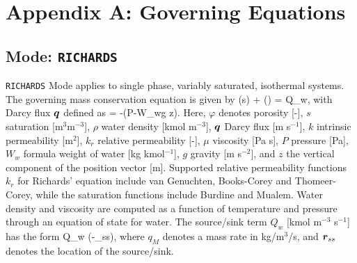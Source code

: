 
\appendix

\section*{Appendix A: Governing Equations}

\renewcommand{\thesection}{\Alph{section}}
\setcounter{section}{1}
\renewcommand{\thesubsection}{\Alph{section}-\arabic{subsection}}

\renewcommand{\theequation}{\Alph{section}-\arabic{equation}}
\setcounter{equation}{0}

\renewcommand{\thetable}{\Alph{section}-\arabic{table}}
\setcounter{table}{0}

\renewcommand{\thefigure}{\Alph{section}-\arabic{figure}}
\setcounter{figure}{0}

\subsection{Mode: {\tt RICHARDS}}

{\tt RICHARDS} Mode applies to single phase, variably saturated, isothermal systems. The governing mass conservation equation is given by
\EQ
{}\left(\varphi s\rho\right) + \bnabla\cdot\left(\rho\bq\right) = Q_w,
\EN
with Darcy flux $\boldsymbol{q}$ defined as
\EQ
\bq = -\bnabla\left(P-W_w\rho g z\right).
\EN
Here, $\varphi$ denotes porosity [-], 
$s$ saturation [m$^3$m$^{-3}$], 
$\rho$ water density [kmol m$^{-3}$], 
$\boldsymbol{q}$ Darcy flux [m s$^{-1}$], 
$k$ intrinsic permeability [m$^2$], 
$k_r$ relative permeability [-], 
$\mu$ viscosity [Pa s], 
$P$ pressure [Pa], 
$W_w$ formula weight of water [kg kmol$^{-1}$], 
$g$ gravity [m s$^{-2}$], and 
$z$ the vertical component of the position vector [m].  
Supported relative permeability functions $k_r$ for Richards' equation include van Genuchten, Books-Corey and Thomeer-Corey, while the saturation functions include Burdine and Mualem.  Water density and viscosity are computed as a function of temperature and pressure through an equation of state for water. The source/sink term $Q_w$ [kmol m$^{-3}$ s$^{-1}$] has the form
\EQ
Q_w \eq {} \delta(\br-\br_{ss}),
\EN
where $q_M$ denotes a mass rate in kg/m$^{3}$/s, and $\boldsymbol{r}_{ss}$ denotes the location of the source/sink.


